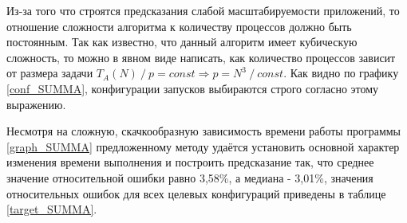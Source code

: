 
			Из-за того что строятся предсказания слабой масштабируемости приложений, то отношение сложности алгоритма к количеству процессов должно быть постоянным. Так как известно, что данный алгоритм имеет кубическую сложность, то можно в явном виде написать, как количество процессов зависит от размера задачи \(T_A(N)\:/\:p = const \Rightarrow p = N^3\:/\:const\). Как видно по графику \eqref{conf_SUMMA}, конфигурации запусков выбираются строго согласно этому выражению.

			Несмотря на сложную, скачкообразную зависимость времени работы программы \eqref{graph_SUMMA} предложенному методу удаётся установить основной характер изменения времени выполнения и построить предсказание так, что среднее значение относительной ошибки равно 3,58\%, а медиана - 3,01\%, значения относительных ошибок для всех целевых конфигураций приведены в таблице \eqref{target_SUMMA}.

